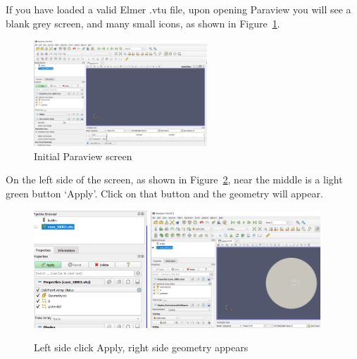 If you have loaded a valid Elmer .vtu file, upon opening Paraview you will see a blank grey screen, and many small icons, as shown in Figure~\ref{fg:para-2}.

\begin{figure}[H]
\begin{center}
\includegraphics[width=0.58\textwidth]{para-2}
\caption{Initial Paraview screen}\label{fg:para-2}
\end{center}
\end{figure}

On the left side of the screen, as shown in Figure~\ref{fg:para-4}, near the middle is a light green button `Apply'.  Click on that button and the geometry will appear.

\begin{figure}[H]
\begin{center}
\includegraphics[width=0.38\textwidth]{para-3}
\includegraphics[width=0.57\textwidth]{para-4}
\caption{Left side click Apply, right side geometry appears}\label{fg:para-4}
\end{center}
\end{figure}

